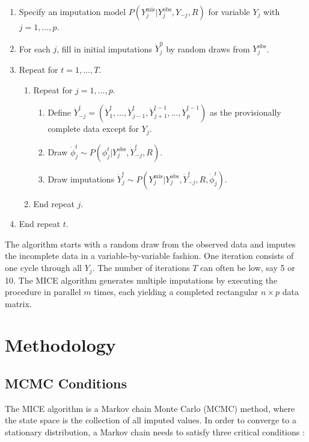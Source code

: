 \documentclass[
]{book}
\begin{document}
\begin{enumerate}
  \item Specify an imputation model $P(Y_j^\mathrm{mis}|Y_j^\mathrm{obs}, Y_{-j}, R)$ for variable $Y_j$ with $j=1,\dots,p$.
  \item For each $j$, fill in initial imputations $\dot{Y}_j^0$ by random draws from $Y_j^\mathrm{obs}$.
  \item Repeat for $t = 1,\dots,T$.
  \begin{enumerate}
    \item[4.] Repeat for $j = 1,\dots,p$.
    \begin{enumerate}
      \item[5.] Define $\dot{Y}_{-j}^t = (\dot{Y}_1^t,\dots,\dot{Y}_{j-1}^t,\dot{Y}_{j+1}^{t-1},\dots,\dot{Y}_p^{t-1})$ as the provisionally complete data except for $Y_j$.
      \item[6.] Draw $\dot{\phi}_j^t \sim P(\phi_j^t|Y_j^\mathrm{obs}, \dot{Y}_{-j}^t, R)$.
      \item[7.] Draw imputations $\dot{Y}_j^t \sim P(Y_j^\mathrm{mis}|Y_j^\mathrm{obs}, \dot{Y}_{-j}^t, R, \dot{\phi}_j^t)$.
    \end{enumerate}
    \item[8.] End repeat $j$.
  \end{enumerate}
  \item[9.] End repeat $t$.
\end{enumerate}

The algorithm starts with a random draw from the observed data and imputes the incomplete data in a variable-by-variable fashion. One iteration consists of one cycle through all \(Y_j\). The number of iterations \(T\) can often be low, say 5 or 10. The MICE algorithm generates multiple imputations by executing the procedure in parallel \(m\) times, each yielding a completed rectangular \(n \times p\) data matrix.

\section{Methodology}\label{methodology}

\subsection{MCMC Conditions}\label{mcmc-conditions}

The MICE algorithm is a Markov chain Monte Carlo (MCMC) method, where the state space is the collection of all imputed values. In order to converge to a stationary distribution, a Markov chain needs to satisfy three critical conditions \citep{ROBERTS1996, TIERNEY1996}:
\end{document}
